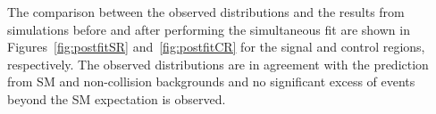 The comparison between the observed distributions and the results from simulations before and after performing the simultaneous fit are shown in Figures~\ref{fig:postfitSR} and~\ref{fig:postfitCR} for the signal and control regions, respectively.
The observed distributions are in agreement with the prediction from SM and non-collision backgrounds and no significant excess of events beyond the SM expectation is observed.

\begin{figure}[htbp]
  \centering
\end{figure}
